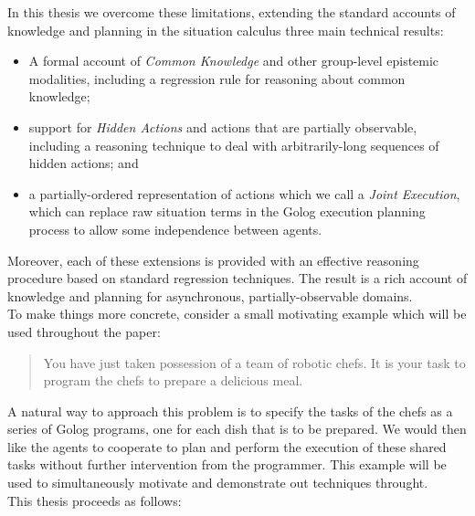 In this thesis we overcome these limitations, extending the standard
accounts of knowledge and planning in the situation calculus three
main technical results:

\begin{itemize}
\item A formal account of \emph{Common Knowledge} and other group-level
epistemic modalities, including a regression rule for reasoning about
common knowledge; 
\item support for \emph{Hidden Actions} and actions that are partially observable,
including a reasoning technique to deal with arbitrarily-long sequences
of hidden actions; and 
\item a partially-ordered representation of actions which we call a \emph{Joint
Execution}, which can replace raw situation terms in the Golog execution
planning process to allow some independence between agents. 
\end{itemize}
Moreover, each of these extensions is provided with an effective reasoning
procedure based on standard regression techniques. The result is a
rich account of knowledge and planning for asynchronous, partially-observable
domains.\\


To make things more concrete, consider a small motivating example
which will be used throughout the paper:

\begin{quote}
You have just taken possession of a team of robotic chefs. It is your
task to program the chefs to prepare a delicious meal. 
\end{quote}
A natural way to approach this problem is to specify the tasks of
the chefs as a series of Golog programs, one for each dish that is
to be prepared. We would then like the agents to cooperate to plan
and perform the execution of these shared tasks without further intervention
from the programmer. This example will be used to simultaneously motivate
and demonstrate out techniques throught.\\


This thesis proceeds as follows:

